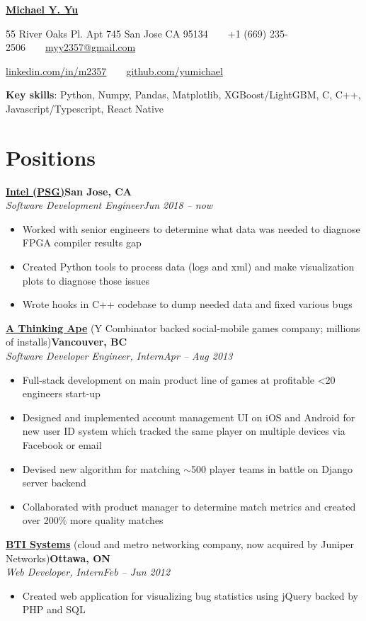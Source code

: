 \documentclass[10pt,letterpaper]{article}
\newcommand*\company[1]{\textbf{#1}}
\newcommand*\position[1]{\textit{#1}}
\newcommand*\location\company
\newcommand*\timespan\position
\begin{document}
\pagestyle{empty}
\begin{center}
{\huge\textbf{\href{https://github.com/yumichael/resume-v5}{Michael Y. Yu}}}

55 River Oaks Pl. Apt 745 San Jose CA 95134\ \ \textbullet\ \ +1 (669) 235-2506\ \ \textbullet\ \ \href{mailto:myy2357@gmail.com}{myy2357@gmail.com}

\href{https://www.linkedin.com/in/m2357/}{linkedin.com/in/m2357}\ \ \textbullet\ \ \href{https://github.com/yumichael}{github.com/yumichael}
\end{center}
\textbf{Key skills}: Python, Numpy, Pandas, Matplotlib, XGBoost/LightGBM, C, C++, Javascript/Typescript, React Native

\section*{Positions}
\company{\href{https://www.intel.com/content/www/us/en/products/programmable.html}{Intel (PSG)}}\hfill\location{San Jose, CA}\\
\position{Software Development Engineer}\hfill\timespan{Jun 2018 -- now}
\begin{itemize}
\item Worked with senior engineers to determine what data was needed to diagnose FPGA compiler results gap
\item Created Python tools to process data (logs and xml) and make visualization plots to diagnose those issues
\item Wrote hooks in C++ codebase to dump needed data and fixed various bugs
\end{itemize}
\company{\href{http://www.athinkingape.com/}{A Thinking Ape}} (Y Combinator backed social-mobile games company; millions of installs)\hfill\location{Vancouver, BC}\\
\position{Software Developer Engineer, Intern}\hfill\timespan{Apr -- Aug 2013}
\begin{itemize}
\item Full-stack development on main product line of games at profitable <20 engineers start-up
\item Designed and implemented account management UI on iOS and Android for new user ID system which tracked the same player on multiple devices via Facebook or email
\item Devised new algorithm for matching \(\sim\)500 player teams in battle on Django server backend
\item Collaborated with product manager to determine match metrics and created over 200\% more quality matches
\end{itemize}
\company{\href{http://www.juniper.net/us/en/dm/bti/}{BTI Systems}} (cloud and metro networking company, now acquired by Juniper Networks)\hfill\location{Ottawa, ON}\\
\position{Web Developer, Intern}\hfill\timespan{Feb -- Jun 2012}
\begin{itemize}
\item Created web application for visualizing bug statistics using jQuery backed by PHP and SQL
\end{itemize}
\end{document}
